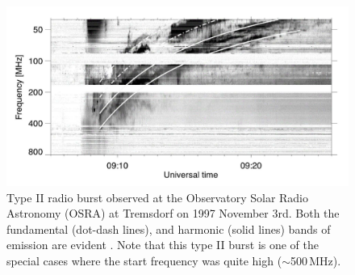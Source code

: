 \begin{figure}
\begin{center}
\includegraphics[trim=2cm 1cm 2cm 3cm, scale=0.25]{images/typeII}
\caption[Type II radio burst]{Type II radio burst observed at the Observatory Solar Radio Astronomy (OSRA) at Tremsdorf on 1997 November 3rd. Both the fundamental (dot-dash lines), and harmonic (solid lines) bands of emission are evident \citep{khan2002}. {\color{blue}Note that this type II burst is one of the special cases where the start frequency was quite high ($\sim$500\,MHz).}}
\label{fig:typeII}
\end{center}
\end{figure}

